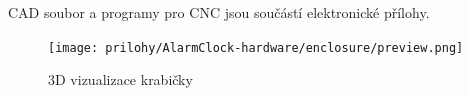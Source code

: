 \clearpage
{}
\label{app:HAconfig}



\clearpage
{}
\label{app:krabicka}
CAD soubor a programy pro CNC jsou součástí elektronické přílohy.
\begin{figure}[htbp]
    \centering
    \texttt{[image: prilohy/AlarmClock-hardware/enclosure/preview.png]}
    \caption{3D vizualizace krabičky}
    \label{fig:krabicka 3d}
\end{figure}
